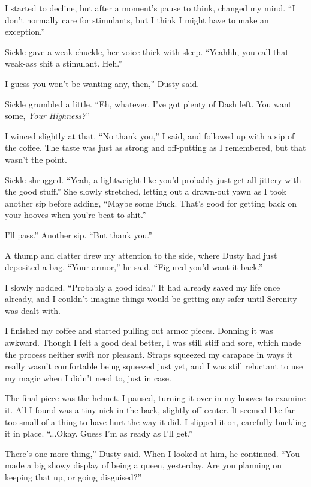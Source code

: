 I started to decline, but after a moment’s pause to think, changed my mind. “I don’t normally care for stimulants, but I think I might have to make an exception.”

Sickle gave a weak chuckle, her voice thick with sleep. “Yeahhh, you call that weak-ass shit a stimulant. Heh.”

\leavevmode{}I guess you won’t be wanting any, then,” Dusty said.

Sickle grumbled a little. “Eh, whatever. I’ve got plenty of Dash left. You want some, \textit{Your Highness?}”

I winced slightly at that. “No thank you,” I said, and followed up with a sip of the coffee. The taste was just as strong and off-putting as I remembered, but that wasn’t the point.

Sickle shrugged. “Yeah, a lightweight like you’d probably just get all jittery with the good stuff.” She slowly stretched, letting out a drawn-out yawn as I took another sip before adding, “Maybe some Buck. That’s good for getting back on your hooves when you’re beat to shit.”

\leavevmode{}I’ll pass.” Another sip. “But thank you.”

A thump and clatter drew my attention to the side, where Dusty had just deposited a bag. “Your armor,” he said. “Figured you’d want it back.”

I slowly nodded. “Probably a good idea.” It had already saved my life once already, and I couldn’t imagine things would be getting any safer until Serenity was dealt with.

I finished my coffee and started pulling out armor pieces. Donning it was awkward. Though I felt a good deal better, I was still stiff and sore, which made the process neither swift nor pleasant. Straps squeezed my carapace in ways it really wasn’t comfortable being squeezed just yet, and I was still reluctant to use my magic when I didn’t need to, just in case.

The final piece was the helmet. I paused, turning it over in my hooves to examine it. All I found was a tiny nick in the back, slightly off-center. It seemed like far too small of a thing to have hurt the way it did. I slipped it on, carefully buckling it in place. “...Okay. Guess I’m as ready as I’ll get.”

\leavevmode{}There’s one more thing,” Dusty said. When I looked at him, he continued. “You made a big showy display of being a queen, yesterday. Are you planning on keeping that up, or going disguised?”

